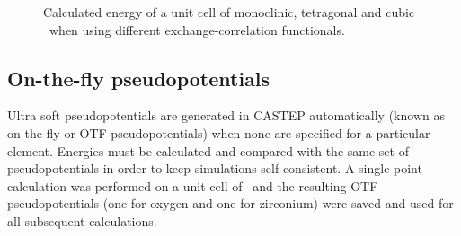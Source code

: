 \begin{figure}[ht!] %
  \begin{center}
    \caption{Calculated energy of a unit cell of monoclinic, tetragonal and cubic \zirconia\ when using different exchange-correlation functionals.}
    \label{Figure:xc_test}
  \end{center}
\end{figure}

\subsection{On-the-fly pseudopotentials}

Ultra soft pseudopotentials are generated in CASTEP automatically (known as on-the-fly or OTF pseudopotentials) when none are specified for a particular element. Energies must be calculated and compared with the same set of pseudopotentials in order to keep simulations self-consistent. A single point calculation was performed on a unit cell of \zirconia\ and the resulting OTF pseudopotentials (one for oxygen and one for zirconium) were saved and used for all subsequent calculations. 

